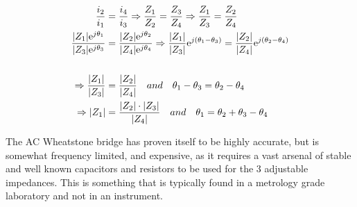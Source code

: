 \begin{equation}
    \begin{split}
        \label{eq:4_2_MatchedWheatstone}
        \frac{i_2}{i_1} &= \frac{i_4}{i_3} \Rightarrow \frac{Z_1}{Z_2} = \frac{Z_3}{Z_4} \Rightarrow \frac{Z_1}{Z_3} = \frac{Z_2}{Z_4} \\
        \frac{|Z_1|\mathrm{e}^{j\theta_1}}{|Z_3|\mathrm{e}^{j\theta_3}} &= \frac{|Z_2|\mathrm{e}^{j\theta_2}}{|Z_4|\mathrm{e}^{j\theta_4}}
        \Rightarrow \frac{|Z_1|}{|Z_3|}\mathrm{e}^{j\left(\theta_1-\theta_3\right)} = \frac{|Z_2|}{|Z_4|}\mathrm{e}^{j\left(\theta_2-\theta_4\right)} \\
        \\
        \Rightarrow \frac{|Z_1|}{|Z_3|} &= \frac{|Z_2|}{|Z_4|} \quad and \quad \theta_1-\theta_3 = \theta_2-\theta_4 \\
        \Rightarrow |Z_1| &= \frac{|Z_2|\cdot|Z_3|}{|Z_4|} \quad and \quad \theta_1 = \theta_2+\theta_3-\theta_4
    \end{split}
\end{equation}

The AC Wheatstone bridge has proven itself to be highly accurate, but is somewhat frequency limited, and expensive, as it requires a
vast arsenal of stable and well known capacitors and resistors to be used for the 3 adjustable impedances. This is something that
is typically found in a metrology grade laboratory and not in an instrument.

